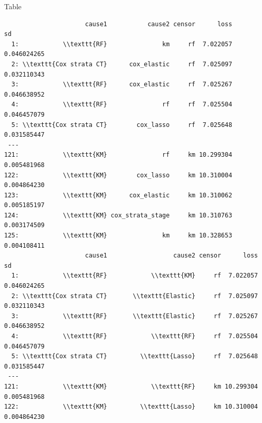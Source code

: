 \documentclass[11pt]{article}
\begin{document}
Table

\begin{verbatim}
                      cause1           cause2 censor      loss          sd
  1:            \\texttt{RF}               km     rf  7.022057 0.046024265
  2: \\texttt{Cox strata CT}      cox_elastic     rf  7.025097 0.032110343
  3:            \\texttt{RF}      cox_elastic     rf  7.025267 0.046638952
  4:            \\texttt{RF}               rf     rf  7.025504 0.046457079
  5: \\texttt{Cox strata CT}        cox_lasso     rf  7.025648 0.031585447
 ---                                                                      
121:            \\texttt{KM}               rf     km 10.299304 0.005481968
122:            \\texttt{KM}        cox_lasso     km 10.310004 0.004864230
123:            \\texttt{KM}      cox_elastic     km 10.310062 0.005185197
124:            \\texttt{KM} cox_strata_stage     km 10.310763 0.003174509
125:            \\texttt{KM}               km     km 10.328653 0.004108411
                      cause1                  cause2 censor      loss          sd
  1:            \\texttt{RF}            \\texttt{KM}     rf  7.022057 0.046024265
  2: \\texttt{Cox strata CT}       \\texttt{Elastic}     rf  7.025097 0.032110343
  3:            \\texttt{RF}       \\texttt{Elastic}     rf  7.025267 0.046638952
  4:            \\texttt{RF}            \\texttt{RF}     rf  7.025504 0.046457079
  5: \\texttt{Cox strata CT}         \\texttt{Lasso}     rf  7.025648 0.031585447
 ---                                                                             
121:            \\texttt{KM}            \\texttt{RF}     km 10.299304 0.005481968
122:            \\texttt{KM}         \\texttt{Lasso}     km 10.310004 0.004864230

\end{verbatim}
\end{document}
